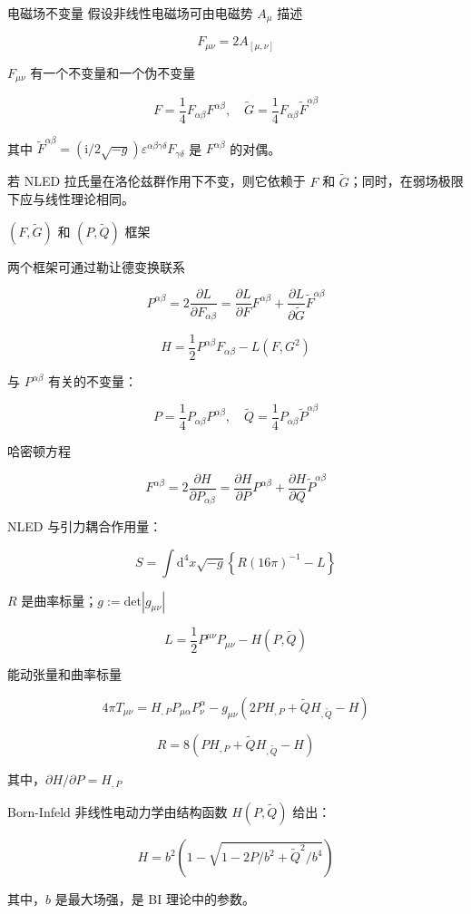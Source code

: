 \documentclass[9pt, dvipsnames]{beamer} %
\begin{document}
\begin{frame}{电磁场不变量}
    假设非线性电磁场可由电磁势 $A_\mu$ 描述

    $$
    F_{\mu\nu}
    =2A_{[\mu,\nu]}
    $$

    $F_{\mu\nu}$ 有一个不变量和一个伪不变量

    $$
    F = \frac{1 }{4 } F_{\alpha\beta}F^{\alpha\beta},\quad
    \tilde{G} = \frac{1 }{4 } F_{\alpha\beta} \tilde{F}^{\alpha\beta} 
    $$

    其中 $\tilde{F}^{\alpha\beta}=\left(\mathrm{i}/2\sqrt{-g} \right)\varepsilon^{\alpha\beta\gamma\delta}F_{\gamma\delta}$ 是 $F^{\alpha\beta}$ 的对偶。

    若 NLED 拉氏量在洛伦兹群作用下不变，则它依赖于 $F$ 和 $\tilde{G}$；同时，在弱场极限下应与线性理论相同。
\end{frame}

\begin{frame}{$(F,\tilde{G})$ 和 $(P,\tilde{Q})$ 框架}

    两个框架可通过勒让德变换联系

    $$
    P^{\alpha\beta}
    =2\frac{\partial L }{\partial F_{\alpha\beta} } 
    =\frac{\partial L }{\partial F } F^{\alpha\beta} + \frac{\partial L }{\partial \tilde{G} } \tilde{F}^{\alpha\beta}
    $$

$$
H
=\frac{1 }{2 } P^{\alpha\beta} F_{\alpha\beta} - L\left(F,G^2 \right)
$$

与 $P^{\alpha\beta} $ 有关的不变量：

$$
P = \frac{1 }{4 } P_{\alpha\beta} P^{\alpha\beta},\quad
\tilde{Q} = \frac{1 }{4 } P_{\alpha\beta}\tilde{P}^{\alpha\beta}
$$

哈密顿方程

$$
F^{\alpha\beta}
=2\frac{\partial H }{\partial P_{\alpha\beta} } 
=\frac{\partial H }{\partial P } P^{\alpha\beta} + \frac{\partial H }{\partial Q } \tilde{P}^{\alpha\beta}
$$
    
\end{frame}

\begin{frame}
    NLED 与引力耦合作用量：

    $$
    S
    =\int \mathrm{d}^4 x\sqrt{-g} \left\{R(16\pi)^{-1}-L \right\}
    $$
    
    $R $ 是曲率标量；$g:=\mathrm{det}\left|g_{\mu\nu} \right| $
    
    $$
    L
    =\frac{1 }{2 } P^{\mu\nu}P_{\mu\nu} - H\left(P,\tilde{Q} \right)
    $$

    能动张量和曲率标量

$$
4\pi T_{\mu\nu}
=H_{,P} P_{\mu\alpha} P_\nu^\alpha - g_{\mu\nu}\left(2P H_{,P} + \tilde{Q} H_{,\tilde{Q}} - H \right)
$$

$$
R
=8\left(P H_{,P} + \tilde{Q} H_{,\tilde{Q}} - H \right) 
$$

其中，$\partial H/\partial P = H_{,P} $ 

Born-Infeld 非线性电动力学由结构函数 $H(P,\tilde{Q}) $ 给出：

$$
H = b^2\left(1-\sqrt{1-2P/b^2+\tilde{Q}^2/b^4} \right) 
$$

其中，$b $ 是最大场强，是 BI 理论中的参数。
\end{frame}
\end{document}
